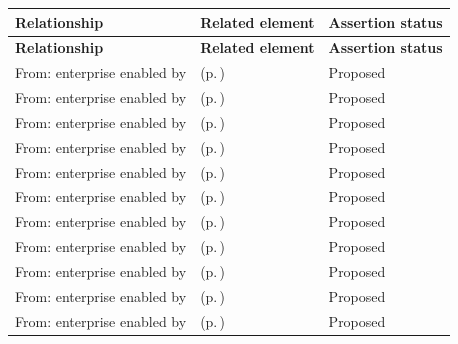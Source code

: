 \begingroup\small\setlength{\TableWidth}{\dimexpr\linewidth-6\tabcolsep-4\arrayrulewidth\relax}
\begin{longtable}{|>{\raggedright\arraybackslash}p{0.27\TableWidth}|>{\raggedright\arraybackslash}p{0.48\TableWidth}|>{\raggedright\arraybackslash}p{0.25\TableWidth}|}
\hline\rowcolor{TableHead}\textbf{Relationship} & \textbf{Related element} & \textbf{Assertion status}\\\hline\endfirsthead
\hline\rowcolor{TableHead}\textbf{Relationship} & \textbf{Related element} & \textbf{Assertion status}\\\hline\endhead
\hline\endfoot
From: enterprise enabled by & \nameref{cap:bec-referral-administration} (p.\,\pageref{cap:bec-referral-administration}) & Proposed\\\hline
From: enterprise enabled by & \nameref{cap:bec-order-administration} (p.\,\pageref{cap:bec-order-administration}) & Proposed\\\hline
From: enterprise enabled by & \nameref{cap:bec-diagnostic-administration} (p.\,\pageref{cap:bec-diagnostic-administration}) & Proposed\\\hline
From: enterprise enabled by & \nameref{cap:bec-medication-administration} (p.\,\pageref{cap:bec-medication-administration}) & Proposed\\\hline
From: enterprise enabled by & \nameref{cap:bec-procedure-administration} (p.\,\pageref{cap:bec-procedure-administration}) & Proposed\\\hline
From: enterprise enabled by & \nameref{cap:bec-episode-encounter-administration} (p.\,\pageref{cap:bec-episode-encounter-administration}) & Proposed\\\hline
From: enterprise enabled by & \nameref{cap:bec-health-information-exchange} (p.\,\pageref{cap:bec-health-information-exchange}) & Proposed\\\hline
From: enterprise enabled by & \nameref{cap:bec-clinical-communication-administration} (p.\,\pageref{cap:bec-clinical-communication-administration}) & Proposed\\\hline
From: enterprise enabled by & \nameref{cap:bec-population-health-notification-enablement} (p.\,\pageref{cap:bec-population-health-notification-enablement}) & Proposed\\\hline
From: enterprise enabled by & \nameref{cap:bec-primary-care} (p.\,\pageref{cap:bec-primary-care}) & Proposed\\\hline
From: enterprise enabled by & \nameref{cap:bec-acute-care} (p.\,\pageref{cap:bec-acute-care}) & Proposed\\\hline

\end{longtable}
